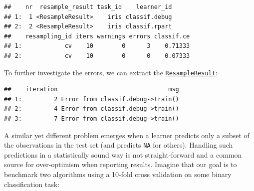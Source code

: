 \documentclass[]{article}
\newenvironment{Shaded}{\begin{snugshade}}{\end{snugshade}}
\newcommand{\DataTypeTok}[1]{\textcolor[rgb]{0.13,0.29,0.53}{#1}}
\newcommand{\FloatTok}[1]{\textcolor[rgb]{0.00,0.00,0.81}{#1}}
\newcommand{\KeywordTok}[1]{\textcolor[rgb]{0.13,0.29,0.53}{\textbf{#1}}}
\newcommand{\NormalTok}[1]{#1}
\newcommand{\OperatorTok}[1]{\textcolor[rgb]{0.81,0.36,0.00}{\textbf{#1}}}
\newcommand{\OtherTok}[1]{\textcolor[rgb]{0.56,0.35,0.01}{#1}}
\newcommand{\StringTok}[1]{\textcolor[rgb]{0.31,0.60,0.02}{#1}}
\renewenvironment{Shaded} {\begin{snugshade}\small} {\end{snugshade}}
\begin{document}
\begin{Shaded}
\end{Shaded}

\begin{verbatim}
##    nr  resample_result task_id    learner_id
## 1:  1 <ResampleResult>    iris classif.debug
## 2:  2 <ResampleResult>    iris classif.rpart
##    resampling_id iters warnings errors classif.ce
## 1:            cv    10        0      3    0.71333
## 2:            cv    10        0      0    0.07333
\end{verbatim}

To further investigate the errors, we can extract the \href{https://mlr3.mlr-org.com/reference/ResampleResult.html}{\texttt{ResampleResult}}:

\begin{Shaded}
\end{Shaded}

\begin{verbatim}
##    iteration                               msg
## 1:         2 Error from classif.debug->train()
## 2:         4 Error from classif.debug->train()
## 3:         7 Error from classif.debug->train()
\end{verbatim}

A similar yet different problem emerges when a learner predicts only a subset of the observations in the test set (and predicts \texttt{NA} for others).
Handling such predictions in a statistically sound way is not straight-forward and a common source for over-optimism when reporting results.
Imagine that our goal is to benchmark two algorithms using a 10-fold cross validation on some binary classification task:
\end{document}
